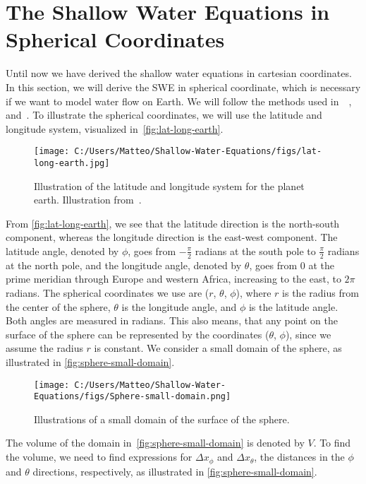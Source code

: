 \section{The Shallow Water Equations in Spherical Coordinates}
Until now we have derived the shallow water equations in cartesian coordinates.
In this section, we will derive the SWE in spherical coordinate, which is necessary if we want to model water flow on Earth.
We will follow the methods used in~\cite{Castro2017}~\cite{Bihlo2022},~\cite{Raymond} and~\cite{Gill_1982}.
To illustrate the spherical coordinates, we will use the latitude and longitude system, visualized in~\autoref{fig:lat-long-earth}.
\begin{figure}[H]
    \centering
    \texttt{[image: C:/Users/Matteo/Shallow-Water-Equations/figs/lat-long-earth.jpg]}
    \caption{Illustration of the latitude and longitude system for the planet earth.
    Illustration from~\cite{lat-long-earth}.}\label{fig:lat-long-earth}
\end{figure}
From \autoref{fig:lat-long-earth}, we see that the latitude direction is the north-south component, whereas the longitude direction is the east-west component.
The latitude angle, denoted by $\phi$, goes from $-\frac{\pi}{2}$ radians at the south pole to $\frac{\pi}{2}$ radians at the north pole, and the longitude angle, denoted by $\theta$, goes from $0$ at the prime meridian through Europe and western Africa, increasing to the east, to $2\pi$ radians.
The spherical coordinates we use are ($r$, $\theta$, $\phi$), where $r$ is the radius from the center of the sphere, $\theta$ is the longitude angle, and $\phi$ is the latitude angle. Both angles are measured in radians.
This also means, that any point on the surface of the sphere can be represented by the coordinates ($\theta$, $\phi$), since we assume the radius $r$ is constant.
We consider a small domain of the sphere, as illustrated in \autoref{fig:sphere-small-domain}.
\begin{figure}[H]
    \centering
    \texttt{[image: C:/Users/Matteo/Shallow-Water-Equations/figs/Sphere-small-domain.png]}
    \caption{Illustrations of a small domain of the surface of the sphere.}\label{fig:sphere-small-domain}
\end{figure}
The volume of the domain in~\autoref{fig:sphere-small-domain} is denoted by $V$.
To find the volume, we need to find expressions for $\Delta x_{\phi}$ and $\Delta x_{\theta}$, the distances in the $\phi$ and $\theta$ directions, respectively, as illustrated in \autoref{fig:sphere-small-domain}.
